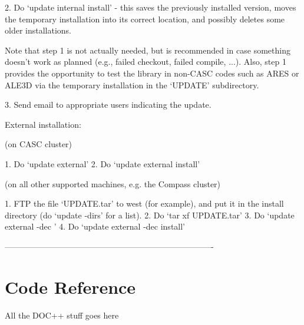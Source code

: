   2. Do `update internal install' - this saves the previously
     installed version, moves the temporary installation into its
     correct location, and possibly deletes some older installations.

     Note that step 1 is not actually needed, but is recommended in case
     something doesn't work as planned (e.g., failed checkout, failed
     compile, ...).  Also, step 1 provides the opportunity to test the
     library in non-CASC codes such as ARES or ALE3D via the temporary
     installation in the `UPDATE' subdirectory.

  3. Send email to appropriate users indicating the update.

External installation:

  (on CASC cluster)

  1. Do `update external'
  2. Do `update external install'

  (on all other supported machines, e.g. the Compass cluster)

  1. FTP the file `UPDATE.tar' to west (for example), and put it
     in the install directory (do `update -dirs' for a list).
  2. Do `tar xf UPDATE.tar'
  3. Do `update external -dec '
  4. Do `update external -dec install'

----------------------------------------------------------------------------


\section{Code Reference}
All the DOC++ stuff goes here
   

